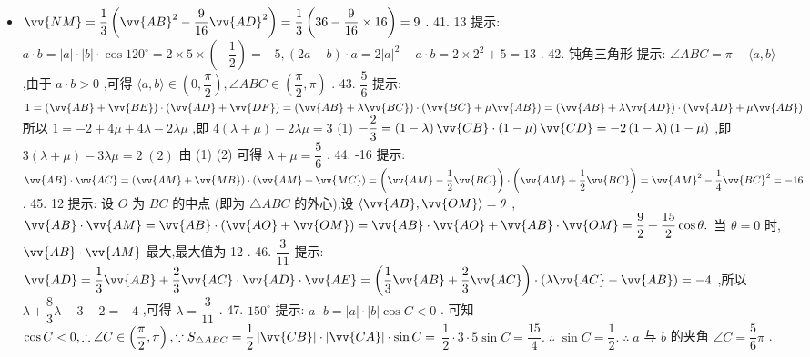 \begin{itemize}
\item $\vv{NM} = \dfrac{1}{3}\left( {{\vv{AB}}^{2} - \dfrac{9}{16}{\vv{AD}}^{2}}\right)  = \dfrac{1}{3}\left( {{36} - \dfrac{9}{16} \times  {16}}\right)  = 9$ . 41. 13 提示: $a \cdot  b = \left| a\right|  \cdot  \left| b\right|  \cdot  \cos {120}^{ \circ  } = 2 \times  5 \times  \left( {-\dfrac{1}{2}}\right)  =  - 5,\left( {{2a} - b}\right)  \cdot  a = 2{\left| a\right| }^{2} - a \cdot  b = 2 \times  {2}^{2} + 5 = {13}$ . 42. 钝角三角形 提示: $\angle {ABC} = \pi  - \langle a,b\rangle$ ,由于 $a \cdot  b > 0$ ,可得 $\langle a,b\rangle  \in  \left( {0,\dfrac{\pi }{2}}\right) ,\angle {ABC} \in  \left( {\dfrac{\pi }{2},\pi }\right)$ . 43. $\dfrac{5}{6}$ 提示: $1 = \left( {\vv{AB} + \vv{BE}}\right)  \cdot  \left( {\vv{AD} + \vv{DF}}\right)  = \left( {\vv{AB} + \lambda \vv{BC}}\right)  \cdot  \left( {\vv{BC} + \mu \vv{AB}}\right)  = \left( {\vv{AB} + \lambda \vv{AD}}\right)  \cdot  \left( {\vv{AD} + \mu \vv{AB}}\right)$ 所以 $1 =  - 2 + {4\mu } + {4\lambda } - {2\lambda \mu }$ ,即 $4\left( {\lambda  + \mu }\right)  - {2\lambda \mu } = 3$ (1) $- \dfrac{2}{3} = \left( {1 - \lambda }\right) \vv{CB} \cdot  \left( {1 - \mu }\right) \vv{CD} =  - 2\left( {1 - \lambda }\right) \left( {1 - \mu }\right)$ ,即 $3\left( {\lambda  + \mu }\right)  - {3\lambda \mu } = 2\;\left( 2\right)$ 由 (1) (2) 可得 $\lambda  + \mu  = \dfrac{5}{6}$ . 44. -16 提示: $\vv{AB} \cdot  \vv{AC} = \left( {\vv{AM} + \vv{MB}}\right)  \cdot  \left( {\vv{AM} + \vv{MC}}\right)  = \left( {\vv{AM} - \dfrac{1}{2}\vv{BC}}\right)  \cdot  \left( {\vv{AM} + \dfrac{1}{2}\vv{BC}}\right)  = {\vv{AM}}^{2} - \dfrac{1}{4}{\vv{BC}}^{2} =  - {16}$ . 45. 12 提示: 设 $O$ 为 ${BC}$ 的中点 (即为 $\bigtriangleup {ABC}$ 的外心),设 $\langle \vv{AB},\vv{OM}\rangle  = \theta$ , $\vv{AB} \cdot  \vv{AM} = \vv{AB} \cdot  \left( {\vv{AO} + \vv{OM}}\right)  = \vv{AB} \cdot  \vv{AO} + \vv{AB} \cdot  \vv{OM} = \dfrac{9}{2} + \dfrac{15}{2}\cos \theta .$ 当 $\theta  = 0$ 时, $\vv{AB} \cdot  \vv{AM}$ 最大,最大值为 12 . 46. $\dfrac{3}{11}$ 提示: $\vv{AD} = \dfrac{1}{3}\vv{AB} + \dfrac{2}{3}\vv{AC} \cdot  \vv{AD} \cdot  \vv{AE} = \left( {\dfrac{1}{3}\vv{AB} + \dfrac{2}{3}\vv{AC}}\right)  \cdot  \left( {\lambda \vv{AC} - \vv{AB}}\right)  =  - 4$ ,所以 $\lambda  + \dfrac{8}{3}\lambda  - 3 - 2 =  - 4$ ,可得 $\lambda  = \dfrac{3}{11}$ . 47. ${150}^{ \circ  }$ 提示: $a \cdot  b = \left| a\right|  \cdot  \left| b\right| \cos C < 0$ . 可知 $\cos C < 0,\therefore \angle C \in  \left( {\dfrac{\pi }{2},\pi }\right) ,\because {S}_{\bigtriangleup {ABC}} = \dfrac{1}{2}\left| \vv{CB}\right|  \cdot  \left| \vv{CA}\right|  \cdot  \sin C =$  $\dfrac{1}{2} \cdot  3 \cdot  5\sin C = \dfrac{15}{4}.\;\therefore \;\sin C = \dfrac{1}{2}.\;\therefore \;a$ 与 $b$ 的夹角 $\angle C = \dfrac{5}{6}\pi$ .
\end{itemize}

